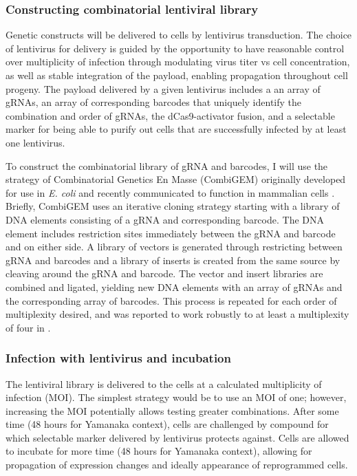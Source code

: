 \documentclass[10pt]{article}
\begin{document}
\subsubsection{Constructing combinatorial lentiviral library}

Genetic constructs will be delivered to cells by lentivirus transduction. The choice of lentivirus for delivery is guided by the opportunity to have reasonable control over multiplicity of infection through modulating virus titer vs cell concentration, as well as stable integration of the payload, enabling propagation throughout cell progeny. The payload delivered by a given lentivirus includes a an array of gRNAs, an array of corresponding barcodes that uniquely identify the combination and order of gRNAs, the dCas9-activator fusion, and a selectable marker for being able to purify out cells that are successfully infected by at least one lentivirus.

To construct the combinatorial library of gRNA and barcodes, I will use the strategy of Combinatorial Genetics En Masse (CombiGEM) \cite{cheng2014enhanced} originally developed for use in \textit{E. coli} and recently communicated to function in mammalian cells \cite{lu2015combigem}. Briefly, CombiGEM uses an iterative cloning strategy starting with a library of DNA elements consisting of a gRNA and corresponding barcode. The DNA element includes restriction sites immediately between the gRNA and barcode and on either side. A library of vectors is generated through restricting between gRNA and barcodes and a library of inserts is created from the same source by cleaving around the gRNA and barcode. The vector and insert libraries are combined and ligated, yielding new DNA elements with an array of gRNAs and the corresponding array of barcodes. This process is repeated for each order of multiplexity desired, and was reported to work robustly to at least a multiplexity of four in \cite{cheng2014enhanced}.

\subsubsection{Infection with lentivirus and incubation}

The lentiviral library is delivered to the cells at a calculated multiplicity of infection (MOI). The simplest strategy would be to use an MOI of one; however, increasing the MOI potentially allows testing greater combinations. After some time (48 hours for Yamanaka context), cells are challenged by compound for which selectable marker delivered by lentivirus protects against. Cells are allowed to incubate for more time (48 hours for Yamanaka context), allowing for propagation of expression changes and ideally appearance of reprogrammed cells.
\end{document}
